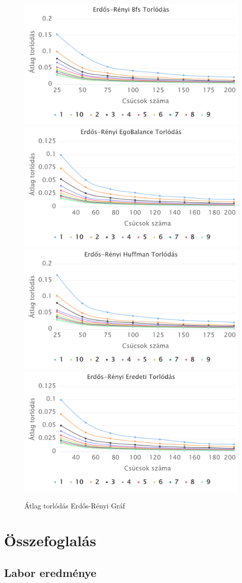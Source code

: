 \documentclass[12pt]{report}
\begin{document}
\begin{figure}[h]
	\begin{center}
		\includegraphics[width=0.49\linewidth]{pictures/erdos_con_bfs.png}
		\includegraphics[width=0.49\linewidth]{pictures/erdos_con_egobalance.png}
		\includegraphics[width=0.49\linewidth]{pictures/erdos_con_huffman.png}
		\includegraphics[width=0.49\linewidth]{pictures/erdos_con_original.png}
		\caption{Átlag torlódás Erdős-Rényi Gráf}
		\label{avg-len}
	\end{center}
\end{figure}



\chapter{Összefoglalás}

\section{Labor eredménye}
\end{document}
